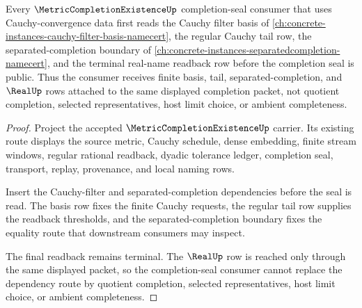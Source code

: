 \begin{theorem}
\label{thm:metric-completion-existence-cauchy-convergence-space-dependency-route}
Every $\MetricCompletionExistenceUp$ completion-seal consumer that uses Cauchy-convergence data first reads the Cauchy filter basis of \autoref{ch:concrete-instances-cauchy-filter-basis-namecert}, the regular Cauchy tail row, the separated-completion boundary of \autoref{ch:concrete-instances-separatedcompletion-namecert}, and the terminal real-name readback row before the completion seal is public. Thus the consumer receives finite basis, tail, separated-completion, and $\RealUp$ rows attached to the same displayed completion packet, not quotient completion, selected representatives, host limit choice, or ambient completeness.
\end{theorem}
\begin{proof}
Project the accepted $\MetricCompletionExistenceUp$ carrier. Its existing route displays the source metric, Cauchy schedule, dense embedding, finite stream windows, regular rational readback, dyadic tolerance ledger, completion seal, transport, replay, provenance, and local naming rows.

Insert the Cauchy-filter and separated-completion dependencies before the seal is read. The basis row fixes the finite Cauchy requests, the regular tail row supplies the readback thresholds, and the separated-completion boundary fixes the equality route that downstream consumers may inspect.

The final readback remains terminal. The $\RealUp$ row is reached only through the same displayed packet, so the completion-seal consumer cannot replace the dependency route by quotient completion, selected representatives, host limit choice, or ambient completeness.
\end{proof}
